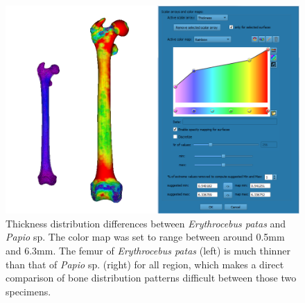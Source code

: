 \documentclass[12pt, a4paper]{book}
\begin{document}
\begin{figure}
  \centering
  \includegraphics[scale=0.45]{Thickness.png}
\caption{Thickness distribution differences between \textit{Erythrocebus patas} and \textit{Papio} sp. The color map was set to range between around 0.5mm and 6.3mm. The femur of \textit{Erythrocebus patas} (left) is much thinner than that of \textit{Papio} sp. (right) for all region, which makes a direct comparison of bone distribution patterns difficult between those two specimens.}	
\label{thickness}
 \end{figure}
\end{document}

